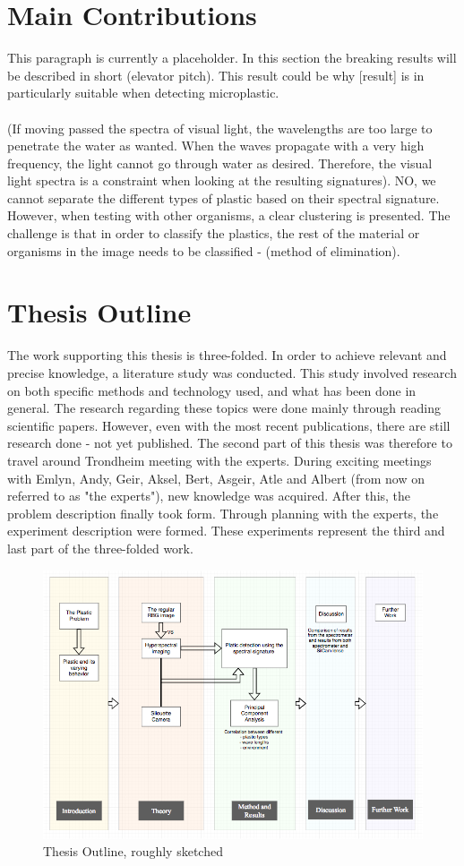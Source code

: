 \section{Main Contributions} This paragraph is currently a placeholder. In this section the breaking results will be described in short (elevator pitch). This result could be why [result] is in particularly suitable when detecting microplastic.
\\\\
(If moving passed the spectra of visual light, the wavelengths are too large to penetrate the water as wanted. When the waves propagate with a very high frequency, the light cannot go through water as desired. Therefore, the visual light spectra is a constraint when looking at the resulting signatures). NO, we cannot separate the different types of plastic based on their spectral signature. However, when testing with other organisms, a clear clustering is presented. The challenge is that in order to classify the plastics, the rest of the material or organisms in the image needs to be classified - (method of elimination). 
\vspace{1.3cm}
\section{Thesis Outline}
The work supporting this thesis is three-folded. In order to achieve relevant and precise knowledge, a literature study was conducted. This study involved research on both specific methods and technology used, and what has been done in general. The research regarding these topics were done mainly through reading scientific papers. However, even with the most recent publications, there are still research done - not yet published. The second part of this thesis was therefore to travel around Trondheim meeting with the experts. During exciting meetings with Emlyn, Andy, Geir, Aksel, Bert, Asgeir, Atle and Albert (from now on referred to as "the experts"), new knowledge was acquired. After this, the problem description finally took form. Through planning with the experts, the experiment description were formed. These experiments represent the third and last part of the three-folded work. 


\begin{figure}
  \includegraphics[width=\linewidth]{Images/outline.png}
  \caption{Thesis Outline, roughly sketched}
  \label{fig:outline}
\end{figure}

